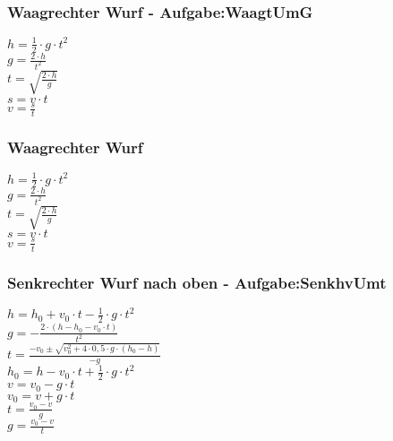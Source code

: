 \subsubsection{Waagrechter Wurf - Aufgabe:WaagtUmG} 
\begin{minipage}{0.45\textwidth} 
$ h = \frac{1}{2}\cdot g\cdot t^{2} $\\ 
$ g = \frac{2\cdot h}{t^{2} } $\\ 
$ t = \sqrt{\frac{2\cdot h}{g}} $\\ 
$ s = v\cdot t $\\ 
$ v = \frac{s}{t} $\\ 
\end{minipage} 
\begin{minipage}{0.45\textwidth} 
 
\end{minipage} 
\subsubsection{Waagrechter Wurf} 
\begin{minipage}{0.45\textwidth} 
$ h = \frac{1}{2}\cdot g\cdot t^{2} $\\ 
$ g = \frac{2\cdot h}{t^{2} } $\\ 
$ t = \sqrt{\frac{2\cdot h}{g}} $\\ 
$ s = v\cdot t $\\ 
$ v = \frac{s}{t} $\\ 
\end{minipage} 
\begin{minipage}{0.45\textwidth} 
 
\end{minipage} 
\subsubsection{Senkrechter Wurf nach oben  - Aufgabe:SenkhvUmt} 
\begin{minipage}{0.45\textwidth} 
$ h = h_{0}  + v_{0} \cdot t - \frac{1}{2}\cdot g\cdot t^{2} $\\ 
$ g = - \frac{2\cdot (h - h_{0}  - v_{0} \cdot t)}{     t^{2} } $\\ 
$ t = \frac{-v_{0}  \pm \sqrt{v_{0} ^{2} +4\cdot 0,5\cdot g\cdot (h_{0}  -h)}}{      -g} $\\ 
$ h_{0}  = h - v_{0} \cdot t + \frac{1}{2}\cdot g\cdot t^{2} $\\ 
$ v = v_{0}  - g\cdot t $\\ 
$ v_{0}  = v + g\cdot t $\\ 
$ t = \frac{v_{0} -v}{  g} $\\ 
$ g = \frac{v_{0}  - v}{  t} $\\ 
\end{minipage} 
\begin{minipage}{0.45\textwidth} 
 
\end{minipage} 
